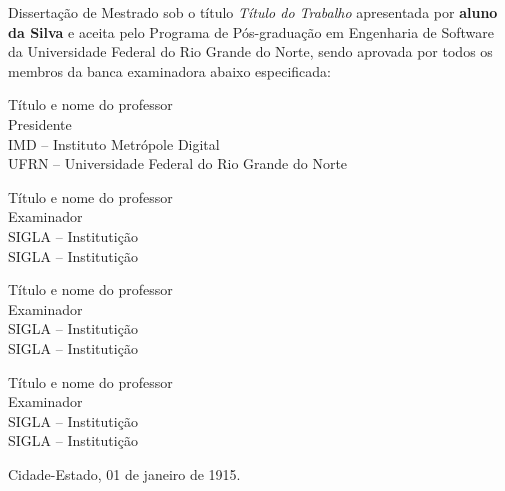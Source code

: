 \begin{folhadeaprovacao}
	
	\noindent 
	Dissertação de Mestrado sob o título \textit{Título do Trabalho} apresentada por \textbf{aluno da Silva} e aceita pelo Programa de Pós-graduação em Engenharia de Software da Universidade Federal do Rio Grande do Norte, sendo aprovada por todos os membros da banca examinadora abaixo especificada:
		
	\assinatura
	{
		Título e nome do professor  			                  \\
		{\small Presidente}											          \smallskip\\ 
		{\footnotesize
			IMD -- Instituto Metrópole Digital		   \\ %
		  	UFRN -- Universidade Federal do Rio Grande do Norte %
		}
   }
      
   \assinatura
	{
		Título e nome do professor  			                  \\
		{\small Examinador}											          \smallskip\\ 
		{\footnotesize
			SIGLA -- Institutição		   \\
		  	SIGLA -- Institutição
		}
   }   
   
   \assinatura
	{
		Título e nome do professor  			                  \\
		{\small Examinador}											          \smallskip\\ 
	    {\footnotesize
			SIGLA -- Institutição		   \\
		  	SIGLA -- Institutição
		}
	}
	
    \assinatura
	{
		Título e nome do professor  			                  \\
		{\small Examinador}											          \smallskip\\ 
		{\footnotesize
			SIGLA -- Institutição		   \\
		  	SIGLA -- Institutição
		}
	}
        
	\vfill
	
	\begin{center}
		Cidade-Estado, 01 de janeiro de 1915.
	\end{center}
\end{folhadeaprovacao}


